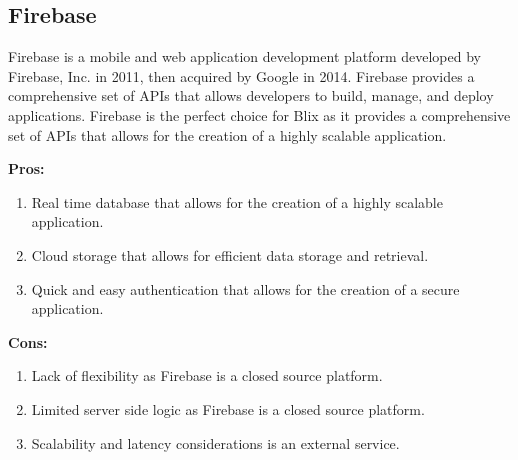 \documentclass[11pt,a4paper]{article}
\begin{document}
\subsection{Firebase}

Firebase is a mobile and web application development platform developed by
Firebase, Inc. in 2011, then acquired by Google in 2014. Firebase provides a
comprehensive set of APIs that allows developers to build, manage, and deploy
applications. Firebase is the perfect choice for Blix as it provides a
comprehensive set of APIs that allows for the creation of a highly scalable
application.

\textbf{Pros:}
\begin{enumerate}[label*=\arabic*.]
	\item[\textbullet] Real time database that allows for the creation of a
	highly scalable application.
	\item[\textbullet] Cloud storage that allows for efficient data storage and
	retrieval.
	\item[\textbullet] Quick and easy authentication that allows for the
	creation of a secure application.
\end{enumerate}

\textbf{Cons:}
\begin{enumerate}[label*=\arabic*.]
	\item[\textbullet] Lack of flexibility as Firebase is a closed source
	platform.
	\item[\textbullet] Limited server side logic as Firebase is a closed source
	platform.
	\item[\textbullet] Scalability and latency considerations is an external
	service.
\end{enumerate}
\end{document}

